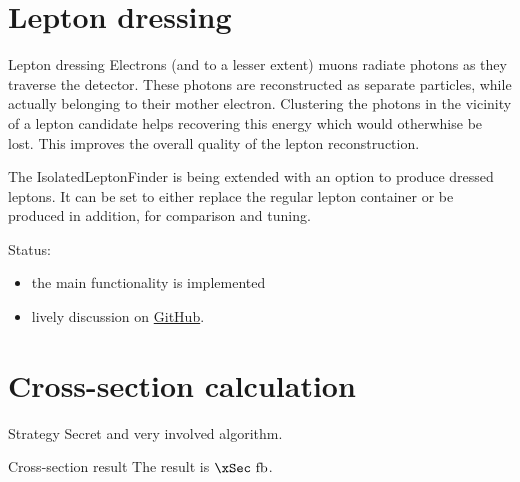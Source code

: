 \documentclass{beamer}
\newcommand{\texpath}{../analysis/tex/tex_ex}
\begin{document}










\section{Lepton dressing}

\begin{frame}{Lepton dressing}
Electrons (and to a lesser extent) muons radiate photons as they traverse the detector. These photons are reconstructed as separate particles, while actually belonging to their mother electron. Clustering the photons in the vicinity of a lepton candidate helps recovering this energy which would otherwhise be lost. This improves the overall quality of the lepton reconstruction.

\vspace{1em}
The IsolatedLeptonFinder is being extended with an option to produce dressed leptons.
It can be set to either replace the regular lepton container or be produced in addition, for comparison and tuning.

\vspace{1em}
Status:
\begin{itemize}
\item the main functionality is implemented
\item lively discussion on \href{https://github.com/iLCSoft/MarlinReco/pull/33}{GitHub}.
\end{itemize}
\end{frame}











\section{Cross-section calculation}



\begin{frame}{Strategy}
Secret and very involved algorithm.
\end{frame}

\begin{frame}{Cross-section result}
The result is $\xSec~\fb$.
\end{frame}
\end{document}
